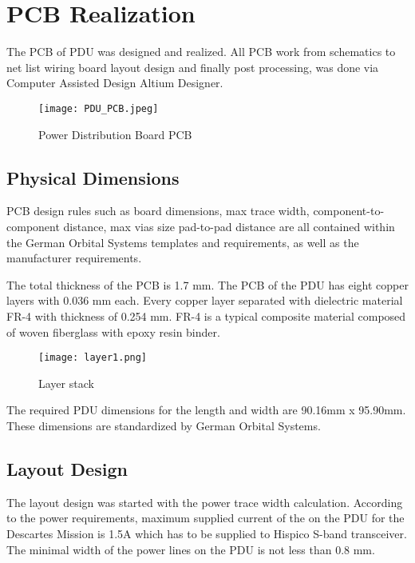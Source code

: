 \chapter{PCB Realization\label{cha:chapter5}}

The PCB of PDU was designed and realized. All PCB work from schematics to net list wiring board layout design and finally post processing, was done via Computer Assisted Design Altium Designer. 

\begin{figure}[h]
	\centering
	\texttt{[image: PDU\_PCB.jpeg]}
	\caption{Power Distribution Board PCB}
	\label{fig: PCB_PDU}
\end{figure} 

\section{Physical Dimensions}

PCB design rules such as board dimensions, max trace width, component-to-component distance, max vias size pad-to-pad distance are all contained within the German Orbital Systems templates and requirements, as well as the manufacturer requirements. 

The total thickness of the PCB is 1.7 mm. The PCB of the PDU has eight copper layers with 0.036 mm each. Every copper layer separated with dielectric material FR-4 with thickness of 0.254 mm. FR-4 is a typical composite material composed of woven fiberglass with epoxy resin binder. 


\begin{figure}[h]
	\centering
	\texttt{[image: layer1.png]}
	\caption{Layer stack}
	\label{fig: layerstack}
\end{figure} 


The required PDU dimensions for the length and width are 90.16mm x 95.90mm. These dimensions are standardized by German Orbital Systems.

\section{Layout Design}

The layout design was started with the power trace width calculation.
According to the power requirements, maximum supplied current of the on the PDU for the Descartes Mission is 1.5A which has to be supplied to Hispico S-band transceiver. The minimal width of the power lines on the PDU is not less than 0.8 mm.


